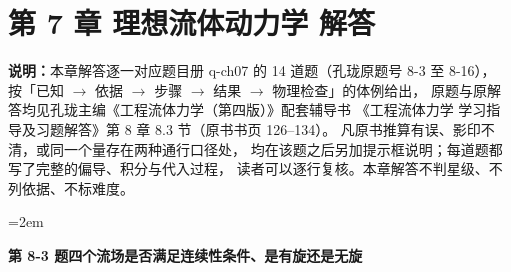 \chapter*{第 7 章 理想流体动力学 解答}


\begin{tishi}
\textbf{说明：}本章解答逐一对应题目册 q-ch07 的 14 道题（孔珑原题号 8-3 至 8-16），
按「已知 $\to$ 依据 $\to$ 步骤 $\to$ 结果 $\to$ 物理检查」的体例给出，
原题与原解答均见孔珑主编《工程流体力学（第四版）》配套辅导书
《工程流体力学 学习指导及习题解答》第 8 章 8.3 节（原书书页 126--134）。
凡原书推算有误、影印不清，或同一个量存在两种通行口径处，
均在该题之后另加提示框说明；每道题都写了完整的偏导、积分与代入过程，
读者可以逐行复核。本章解答不判星级、不列依据、不标难度。
\end{tishi}

\sloppy
\emergencystretch=2em

\noindent\textbf{第 8-3 题\quad 四个流场是否满足连续性条件、是有旋还是无旋}

